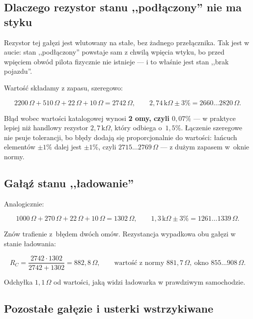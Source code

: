\documentclass[a4paper,11pt]{article}
\newcommand{\ohm}{\,\Omega}
\newcommand{\kohm}{\,\mathrm{k}\Omega}
\begin{document}
\subsection{Dlaczego rezystor stanu ,,podłączony'' nie ma styku}

Rezystor tej gałęzi jest wlutowany na stałe, bez żadnego przełącznika. Tak jest
w aucie: stan ,,podłączony'' powstaje sam z chwilą wpięcia wtyku, bo przed wpięciem
obwód pilota fizycznie nie istnieje --- i to właśnie jest stan ,,brak pojazdu''.

Wartość składamy z zapasu, szeregowo:

\[
2200\ohm+510\ohm+22\ohm+10\ohm=2742\ohm ,
\qquad
2{,}74\kohm\pm3\%=2660\ldots2820\ohm .
\]

Błąd wobec wartości katalogowej wynosi \textbf{2 omy, czyli $0{,}07\%$} --- w praktyce
lepiej niż handlowy rezystor $2{,}7\kohm$, który odbiega o~$1{,}5\%$. Łączenie szeregowe
nie psuje tolerancji, bo błędy dodają się proporcjonalnie do wartości: łańcuch
elementów $\pm1\%$ dalej jest $\pm1\%$, czyli $2715\ldots2769\ohm$ --- z dużym zapasem
w~oknie normy.

\subsection{Gałąź stanu ,,ładowanie''}

Analogicznie:

\[
1000\ohm+270\ohm+22\ohm+10\ohm=1302\ohm ,
\qquad
1{,}3\kohm\pm3\%=1261\ldots1339\ohm .
\]

Znów trafienie z~błędem dwóch omów. Rezystancja wypadkowa obu gałęzi w stanie
ładowania:

\[
R_C=\frac{2742\cdot1302}{2742+1302}=882{,}8\ohm ,
\qquad
\text{wartość z normy } 881{,}7\ohm,\ \text{okno } 855\ldots908\ohm .
\]

Odchyłka $1{,}1\ohm$ od wartości, jaką widzi ładowarka w prawdziwym samochodzie.

\subsection{Pozostałe gałęzie i usterki wstrzykiwane}
\end{document}

